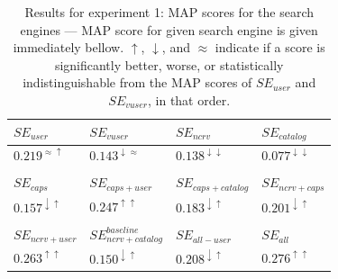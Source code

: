 \begin{table}[tb]
\centering
\begin{footnotesize}
\label{table:results}
\begin{tabular}{l|l|l|l}
\toprule
$SE_{user}$ & $SE_{vuser}$ & $SE_{ncrv}$ & $SE_{catalog}$\\
\hline
$0.219^{\approx \uparrow}$ & $0.143^{\downarrow \approx}$ & $0.138^{\downarrow \downarrow}$ & $0.077^{\downarrow \downarrow}$\\
\hline
\multicolumn{4}{c}{ }\\
\hline
$SE_{caps}$ & $SE_{caps+user}$ & $SE_{caps+catalog}$ & $SE_{ncrv+caps}$\\
\hline
$0.157^{\downarrow \uparrow}$ & $0.247^{\uparrow \uparrow}$ & $0.183^{\downarrow \uparrow}$ & $0.201^{\downarrow \uparrow}$ \\
\hline
\multicolumn{4}{c}{ }\\
\hline
$SE_{ncrv+user}$ & $SE_{ncrv+catalog}^{baseline}$ & $SE_{all-user}$ & $SE_{all}$\\
\hline
$0.263^{\uparrow \uparrow}$ & $0.150^{\downarrow \uparrow}$ & $0.208^{\downarrow \uparrow}$ & $0.276^{\uparrow \uparrow}$ \\
\bottomrule
\end{tabular}
\caption{Results for experiment 1: MAP scores for the search engines --- MAP score for given search engine is given immediately bellow. $\uparrow$, $\downarrow$, and $\approx$ indicate if a score is significantly better, worse, or statistically indistinguishable from the MAP scores of $SE_{user}$ and $SE_{vuser}$, in that order.}
\end{footnotesize}
\end{table}


